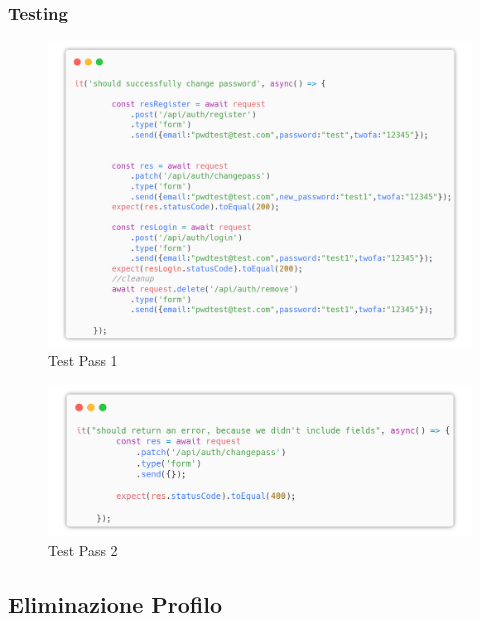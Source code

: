 \documentclass{report}
\begin{document}
\subsubsection*{Testing}
\begin{figure}[H]
	\centering\includegraphics[width=1\textwidth]{images/microservizio-autenticazione/tests/password_test_1.png}
	\caption{Test Pass 1}
\end{figure}
\begin{figure}[H]
	\centering\includegraphics[width=1\textwidth]{images/microservizio-autenticazione/tests/password_test_2.png}
	\caption{Test Pass 2}
\end{figure}
\subsection{Eliminazione Profilo}
\end{document}
